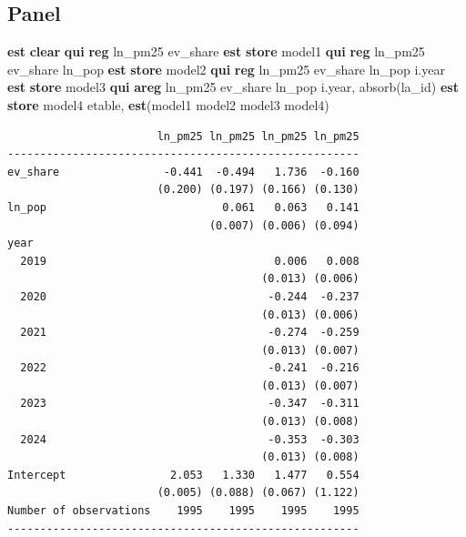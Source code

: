 \documentclass[
  letterpaper,
  DIV=11,
  numbers=noendperiod]{scrartcl}
\newenvironment{Shaded}{\begin{snugshade}}{\end{snugshade}}
\newcommand{\FunctionTok}[1]{\textcolor[rgb]{0.28,0.35,0.67}{#1}}
\newcommand{\KeywordTok}[1]{\textcolor[rgb]{0.00,0.23,0.31}{\textbf{#1}}}
\newcommand{\NormalTok}[1]{\textcolor[rgb]{0.00,0.23,0.31}{#1}}
\begin{document}
\subsection{Panel}\label{panel}

\begin{Shaded}
\begin{Highlighting}[]
\KeywordTok{est} \KeywordTok{clear}
\KeywordTok{qui} \KeywordTok{reg}\NormalTok{ ln\_pm25 ev\_share }
    \KeywordTok{est} \KeywordTok{store}\NormalTok{ model1}
\KeywordTok{qui} \KeywordTok{reg}\NormalTok{ ln\_pm25 ev\_share ln\_pop}
    \KeywordTok{est} \KeywordTok{store}\NormalTok{ model2}
\KeywordTok{qui} \KeywordTok{reg}\NormalTok{ ln\_pm25 ev\_share ln\_pop i.}\FunctionTok{year}
    \KeywordTok{est} \KeywordTok{store}\NormalTok{ model3}
\KeywordTok{qui} \KeywordTok{areg}\NormalTok{ ln\_pm25 ev\_share ln\_pop i.}\FunctionTok{year}\NormalTok{, absorb(la\_id)}
    \KeywordTok{est} \KeywordTok{store}\NormalTok{ model4}
\NormalTok{etable, }\KeywordTok{est}\NormalTok{(model1 model2 model3 model4)}
\end{Highlighting}
\end{Shaded}

\begin{verbatim}
                       ln_pm25 ln_pm25 ln_pm25 ln_pm25
------------------------------------------------------
ev_share                -0.441  -0.494   1.736  -0.160
                       (0.200) (0.197) (0.166) (0.130)
ln_pop                           0.061   0.063   0.141
                               (0.007) (0.006) (0.094)
year                                                  
  2019                                   0.006   0.008
                                       (0.013) (0.006)
  2020                                  -0.244  -0.237
                                       (0.013) (0.006)
  2021                                  -0.274  -0.259
                                       (0.013) (0.007)
  2022                                  -0.241  -0.216
                                       (0.013) (0.007)
  2023                                  -0.347  -0.311
                                       (0.013) (0.008)
  2024                                  -0.353  -0.303
                                       (0.013) (0.008)
Intercept                2.053   1.330   1.477   0.554
                       (0.005) (0.088) (0.067) (1.122)
Number of observations    1995    1995    1995    1995
------------------------------------------------------
\end{verbatim}
\end{document}
